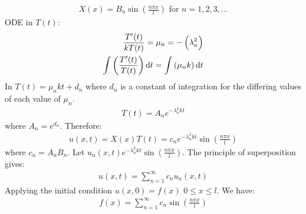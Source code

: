 \documentclass[11pt]{article}
\numberwithin{equation}{section}
\begin{document}
\begin{align}
	X(x) = B_n \sin\left(\frac{n\pi x}{l}\right) \textrm{ for } n=1,2,3,...
\end{align}
ODE in $T(t)$:
\begin{align}
	\frac{T'(t)}{kT(t)} = \mu_n = -\left(\lambda_n^2\right)\\
	\int \left(\frac{T'(t)}{T(t)}\right) \dif t = \int \left(\mu_n k\right) \dif t
\end{align}
In $T(t) = \mu_n kt + d_n$ where $d_n$ is a constant of integration for the differing values of each value of $\mu_n$.
\begin{align}
	T(t) = A_n e^{-\lambda_n^2 kt} 
\end{align}
where $A_n = e^{d_n}$. Therefore:
\begin{align}
	u(x,t) = X(x)T(t) = c_n e^{-\lambda_n^2 kt}\sin\left(\frac{n\pi x}{l}\right)
\end{align}
where $c_n = A_n B_n$. Let $u_n(x,t) e^{-\lambda_n^2 kt}\sin\left(\frac{n\pi x}{l}\right)$. The principle of superposition gives:
\begin{align}
	u(x,t) = \sum_{n=1}^{\infty} c_n u_n(x,t)
\end{align}
Applying the initial condition $u(x,0) = f(x)$ $0\leq x\leq l$. We have:
\begin{align}
	f(x) = \sum_{n=1}^{\infty} c_n \sin\left(\frac{n\pi x}{l}\right)
\end{align}
\end{document}
